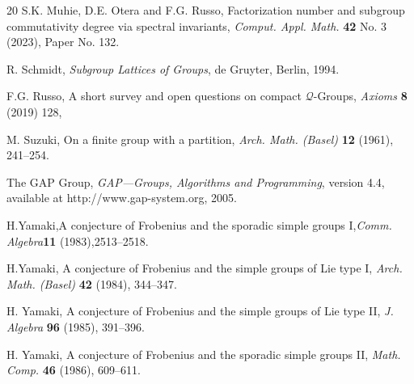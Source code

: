 \documentclass{amsart}
\theoremstyle{definition}
\numberwithin{equation}{section}
\begin{document}
\begin{thebibliography}{20}
S.K. Muhie, D.E. Otera and F.G. Russo, Factorization number and subgroup commutativity degree via spectral invariants, \textit{Comput. Appl. Math.} \textbf{42} No. 3 (2023), Paper No. 132. 

   R. Schmidt, \textit{Subgroup Lattices of Groups}, de Gruyter, Berlin, 1994.

F.G. Russo,  A short survey and open questions on compact $\mathcal{Q}$-Groups, \textit{Axioms}  \textbf{8} (2019) 128,%

    M. Suzuki, On a finite group with a partition, \textit{Arch. Math. (Basel)} \textbf{12} (1961), 241--254.


  The GAP Group, \textit{GAP---Groups, Algorithms and Programming}, version 4.4, available at http://www.gap-system.org, 2005.


 H.Yamaki,A conjecture of Frobenius and the sporadic simple groups I,\textit{Comm. Algebra}\textbf{11} (1983),2513--2518.

H.Yamaki, A conjecture of Frobenius and the simple groups of Lie type I, \textit{Arch. Math. (Basel)} \textbf{42} (1984), 344--347.

 H. Yamaki, A conjecture of Frobenius and the simple groups of Lie type II, \textit{J. Algebra} \textbf{96} (1985), 391--396.

 H. Yamaki, A conjecture of Frobenius and the sporadic simple groups II, \textit{Math. Comp.} \textbf{46} (1986), 609--611.


\end{thebibliography}
\end{document}
